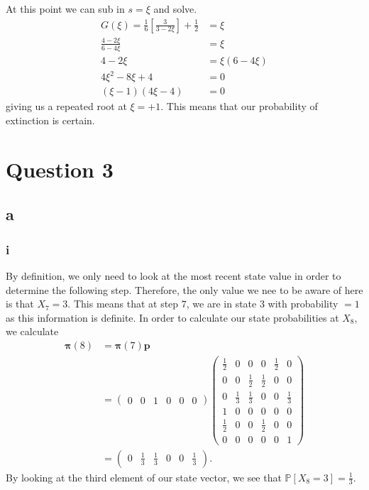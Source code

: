 \documentclass{article}
\newcommand{\Prob}{\mathbb{P}}
\begin{document}
At this point we can sub in $s=\xi$ and solve.
\begin{align}
    G(\xi) = \frac{1}{6}\left[ \frac{3}{3-2\xi} \right] + \frac{1}{2} &= \xi \\
    \frac{4-2\xi}{6-4\xi} &= \xi \\
    4-2\xi &= \xi(6-4\xi) \\
    4\xi^2-8\xi+4 &= 0 \\
    (\xi-1)(4\xi-4) &= 0
\end{align}
giving us a repeated root at $\xi=+1$. This means that our probability of extinction is certain.

\pagebreak
\section{Question 3}
\subsection{a}
\subsubsection{i}
By definition, we only need to look at the most recent state value in order to determine the following step. Therefore, the only value we nee to be aware of here is that $X_7=3$. This means that at step $7$, we are in state $3$ with probability $= 1$ as this information is definite. In order to calculate our state probabilities at $X_8$, we calculate
\begin{align}
    \mathbf{\pi}(8) &= \mathbf{\pi}(7)\mathbf{p} \\ 
    &= \begin{pmatrix} 0 & 0 & 1 & 0 & 0 & 0 \end{pmatrix}\begin{pmatrix}
        \frac{1}{2} & 0 & 0 & 0 & \frac{1}{2} & 0 \\
        0 & 0 & \frac{1}{2} & \frac{1}{2} & 0 & 0 \\
        0 & \frac{1}{3} & \frac{1}{3} & 0 & 0 & \frac{1}{3} \\
        1 & 0 & 0 & 0 & 0 & 0 \\
        \frac{1}{2} & 0 & 0 & \frac{1}{2} & 0 & 0 \\
        0 & 0 & 0 & 0 & 0 & 1
    \end{pmatrix} \\
    &= \begin{pmatrix} 0 & \frac{1}{3} & \frac{1}{3} & 0 & 0 & \frac{1}{3} \end{pmatrix}.
\end{align}
By looking at the third element of our state vector, we see that $\Prob[X_8=3] = \frac{1}{3}$. 
\end{document}
